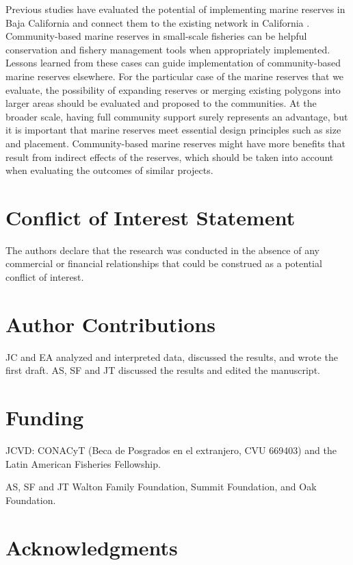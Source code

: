 \documentclass{frontiersSCNS}
\begin{document}
Previous studies have evaluated the potential of implementing marine
reserves in Baja California and connect them to the existing network in
California \citep{arafehdalmau_2017}. Community-based marine reserves in
small-scale fisheries can be helpful conservation and fishery management
tools when appropriately implemented. Lessons learned from these cases
can guide implementation of community-based marine reserves elsewhere.
For the particular case of the marine reserves that we evaluate, the
possibility of expanding reserves or merging existing polygons into
larger areas should be evaluated and proposed to the communities. At the
broader scale, having full community support surely represents an
advantage, but it is important that marine reserves meet essential
design principles such as size and placement. Community-based marine
reserves might have more benefits that result from indirect effects of
the reserves, which should be taken into account when evaluating the
outcomes of similar projects.

\section*{Conflict of Interest Statement}

The authors declare that the research was conducted in the absence of
any commercial or financial relationships that could be construed as a
potential conflict of interest.

\section*{Author Contributions}

JC and EA analyzed and interpreted data, discussed the results, and
wrote the first draft. AS, SF and JT discussed the results and edited
the manuscript.

\section*{Funding}

JCVD: CONACyT (Beca de Posgrados en el extranjero, CVU 669403) and the
Latin American Fisheries Fellowship.

AS, SF and JT Walton Family Foundation, Summit Foundation, and Oak
Foundation.

\section*{Acknowledgments}
\end{document}
